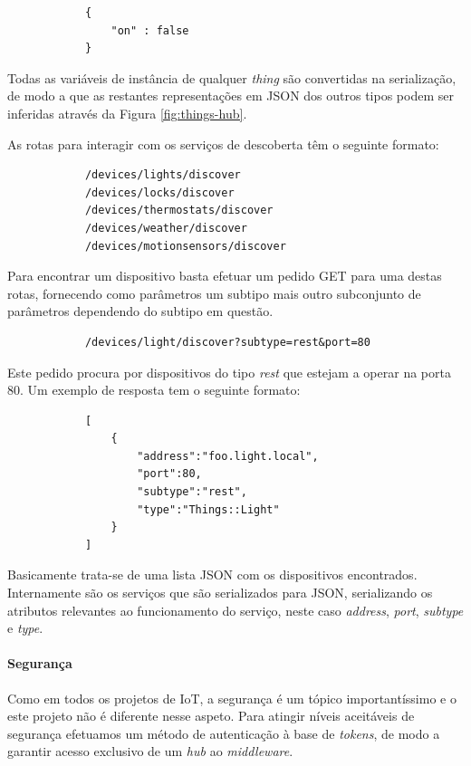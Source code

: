 \begin{verbatim}
            {
                "on" : false
            }
\end{verbatim}

Todas as variáveis de instância de qualquer \textit{thing} são convertidas na serialização, de modo a que as restantes representações em JSON dos outros tipos podem ser inferidas através da Figura \ref{fig:things-hub}.

As rotas para interagir com os serviços de descoberta têm o seguinte formato:

\begin{verbatim}
            /devices/lights/discover
            /devices/locks/discover
            /devices/thermostats/discover
            /devices/weather/discover
            /devices/motionsensors/discover
\end{verbatim}

Para encontrar um dispositivo basta efetuar um pedido GET para uma destas rotas, fornecendo como parâmetros um subtipo mais outro subconjunto de parâmetros dependendo do subtipo em questão.

\begin{verbatim}
            /devices/light/discover?subtype=rest&port=80
\end{verbatim}

Este pedido procura por dispositivos do tipo \textit{rest} que estejam a operar na porta 80. Um exemplo de resposta tem o seguinte formato:

\begin{verbatim}
            [
                {
                    "address":"foo.light.local",
                    "port":80,
                    "subtype":"rest",
                    "type":"Things::Light"
                }
            ]
\end{verbatim}

Basicamente trata-se de uma lista JSON com os dispositivos encontrados. Internamente são os serviços que são serializados para JSON, serializando os atributos relevantes ao funcionamento do serviço, neste caso \textit{address}, \textit{port}, \textit{subtype} e \textit{type}.

\paragraph*{Segurança}

Como em todos os projetos de IoT, a segurança é um tópico importantíssimo e o este projeto não é diferente nesse aspeto. Para atingir níveis aceitáveis de segurança efetuamos um método de autenticação à base de \textit{tokens}, de modo a garantir acesso exclusivo de um \textit{hub} ao \textit{middleware}.

